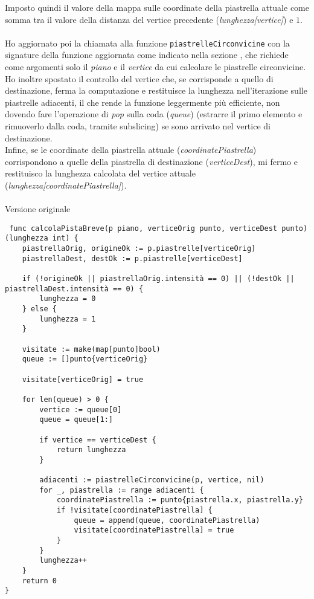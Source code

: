 \documentclass{article}
\begin{document}
Imposto quindi il valore della mappa sulle coordinate della piastrella attuale come somma tra il valore della distanza del vertice precedente (\textit{lunghezza[vertice]}) e \(1\).
\\ \\
Ho aggiornato poi la chiamata alla funzione \texttt{piastrelleCirconvicine} con la signature della funzione aggiornata come indicato nella sezione , che richiede come argomenti solo il \textit{piano} e il \textit{vertice} da cui calcolare le piastrelle circonvicine.\\
Ho inoltre spostato il controllo del vertice che, se corrisponde a quello di destinazione, ferma la computazione e restituisce la lunghezza nell'iterazione sulle piastrelle adiacenti, il che rende la funzione leggermente più efficiente, non dovendo fare l'operazione di \textit{pop} sulla coda (\textit{queue}) (estrarre il primo elemento e rimuoverlo dalla coda, tramite subslicing) se sono arrivato nel vertice di destinazione.
\\
Infine, se le coordinate della piastrella attuale (\textit{coordinatePiastrella}) corrispondono a quelle della piastrella di destinazione (\textit{verticeDest}), mi fermo e restituisco la lunghezza calcolata del vertice attuale (\textit{lunghezza[coordinatePiastrella]}).
\\ \\
Versione originale
\begin{verbatim}
 func calcolaPistaBreve(p piano, verticeOrig punto, verticeDest punto) (lunghezza int) {
	piastrellaOrig, origineOk := p.piastrelle[verticeOrig]
	piastrellaDest, destOk := p.piastrelle[verticeDest]

	if (!origineOk || piastrellaOrig.intensità == 0) || (!destOk || piastrellaDest.intensità == 0) {
		lunghezza = 0
	} else {
		lunghezza = 1
	}

	visitate := make(map[punto]bool)
	queue := []punto{verticeOrig}

	visitate[verticeOrig] = true

	for len(queue) > 0 {
		vertice := queue[0]
		queue = queue[1:]

		if vertice == verticeDest {
			return lunghezza
		}

		adiacenti := piastrelleCirconvicine(p, vertice, nil)
		for _, piastrella := range adiacenti {
			coordinatePiastrella := punto{piastrella.x, piastrella.y}
			if !visitate[coordinatePiastrella] {
				queue = append(queue, coordinatePiastrella)
				visitate[coordinatePiastrella] = true
			}
		}
		lunghezza++
	}
	return 0
} 
\end{verbatim}
\end{document}
